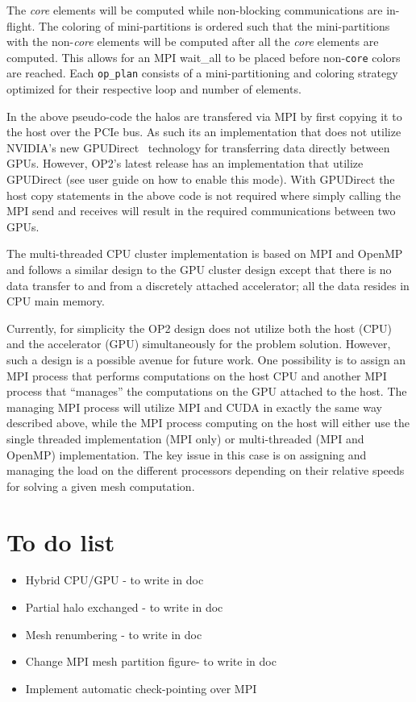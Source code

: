 \documentclass[11pt]{article}
\begin{document}
\noindent The \textit{core} elements will be computed while non-blocking communications are in-flight. The coloring of
mini-partitions is ordered such that the mini-partitions with the non-\textit{core} elements will be computed after all
the \textit{core} elements are computed. This allows for an MPI wait\_all to be placed before non-\texttt{core} colors
are reached. Each \texttt{op\_plan} consists of a mini-partitioning and coloring strategy optimized for their respective
loop and number of elements.

In the above pseudo-code the halos are transfered via MPI by first copying it to the host over the PCIe bus. As such
its an implementation that does not utilize NVIDIA's new GPUDirect~\cite{gpudirect} technology for transferring data
directly between GPUs. However, OP2's latest release has an implementation that utilize GPUDirect (see user guide on
how to enable this mode). With GPUDirect the host copy statements in the above code is not required where simply
calling the MPI send and receives will result in the required communications between two GPUs.

The multi-threaded CPU cluster implementation is based on MPI and OpenMP and follows a similar design to the
GPU cluster design except that there is no data transfer to and from a discretely attached accelerator; all the data
resides in CPU main memory.

Currently, for simplicity the OP2 design does not utilize both the host (CPU) and the accelerator (GPU) simultaneously
for the problem solution. However, such a design is a possible avenue for future work. One possibility is to assign an
MPI process that performs computations on the host CPU and another MPI process that ``manages'' the computations on the
GPU attached to the host. The managing MPI process will utilize MPI and CUDA in exactly the same way described above,
while the MPI process computing on the host will either use the single threaded implementation (MPI only) or
multi-threaded (MPI and OpenMP) implementation. The key issue in this case is on assigning and managing the load on the
different processors depending on their relative speeds for solving a given mesh computation.

\section{To do list}
\begin{itemize}
\item Hybrid CPU/GPU - to write in doc
\item Partial halo exchanged - to write in doc
\item Mesh renumbering - to write in doc
\item Change MPI mesh partition figure- to write in doc
\item Implement automatic check-pointing over MPI
\end{itemize}
\end{document}
